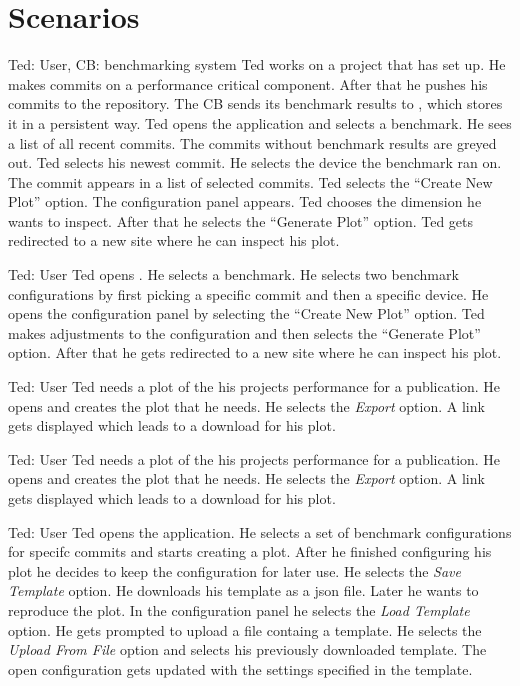 \section{Scenarios}

{Ted: User, CB: \Gls{benchmarking system}}
{Ted works on a project that has \parkview{} set up. He makes commits on a performance critical component. After that he pushes his commits to the repository. The CB sends its \glspl{benchmark result} to \parkview{}, which stores it in a persistent way. Ted opens the application and selects a \gls{benchmark}. He sees a list of all recent commits. The commits without \glspl{benchmark result} are greyed out. Ted selects his newest commit. He selects the device the \gls{benchmark} ran on. The commit appears in a list of selected commits. Ted selects the \enquote{Create New Plot} option. The configuration panel appears. Ted chooses the dimension he wants to inspect. After that he selects the \enquote{Generate Plot} option. Ted gets redirected to a new site where he can inspect his \gls{plot}.}

{Ted: User}
{Ted opens \parkview{}. He selects a \gls{benchmark}. He selects two \glspl{benchmark configuration} by first picking a specific commit and then a specific device. He opens the configuration panel by selecting the \enquote{Create New Plot} option. Ted makes adjustments to the \gls{configuration} and then selects the \enquote{Generate Plot} option. After that he gets redirected to a new site where he can inspect his \gls{plot}.}

{Ted: User}
{Ted needs a \gls{plot} of the his projects performance for a publication. He opens \parkview{} and creates the plot that he needs. He selects the \emph{Export} option. A link gets displayed which leads to a download for his \gls{plot}.}

{Ted: User}
{Ted needs a \gls{plot} of the his projects performance for a publication. He opens \parkview{} and creates the plot that he needs. He selects the \emph{Export} option. A link gets displayed which leads to a download for his \gls{plot}.}

{Ted: User}
{Ted opens the application. He selects a set of \glspl{benchmark configuration} for specifc commits and starts creating a \gls{plot}. After he finished configuring his \gls{plot} he decides to keep the \gls{configuration} for later use. He selects the \emph{Save Template} option. He downloads his template as a \gls{json} file. Later he wants to reproduce the \gls{plot}. In the configuration panel he selects the \emph{Load Template} option. He gets prompted to upload a file containg a \gls{template}. He selects the \emph{Upload From File} option and selects his previously downloaded \gls{template}. The open \gls{configuration} gets updated with the settings specified in the \gls{template}.}

